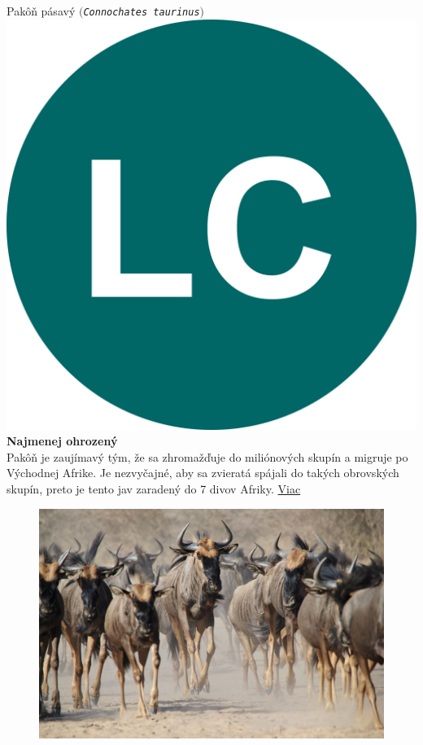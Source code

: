 \documentclass{article}
\begin{document}
Pakôň pásavý  $($\texttt{\textit{Connochates taurinus}}$)$\includegraphics[scale=0.015]{LC.png}{\color{ForestGreen} \textbf{Najmenej ohrozený}}\\

Pakôň je zaujímavý tým, že sa zhromažďuje do miliónových skupín a migruje po Východnej Afrike. Je nezvyčajné, aby sa zvieratá spájali do takých obrovských skupín, preto je tento jav zaradený do 7 divov Afriky. \hyperref[sec:gmwildebe]{Viac}\\
\vskip 2mm 
\begin{figure}[h]
\includegraphics[scale=0.6]{pakone-masai.jpg}
\end{figure}
\newpage
\end{document}
